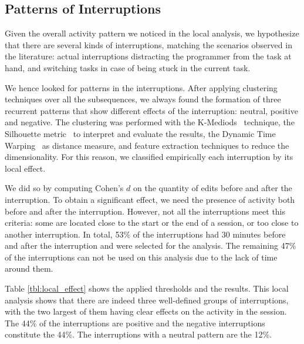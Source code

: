 \subsection{Patterns of Interruptions}
Given the overall activity pattern we noticed in the local analysis, we hypothesize that there are several kinds of interruptions, matching the scenarios observed in the literature: actual interruptions distracting the programmer from the task at hand, and switching tasks in case of being stuck in the current task.

We hence looked for patterns in the interruptions. After applying clustering techniques over all the subsequences, we always found the formation of three recurrent patterns that show different effects of the interruption: neutral, positive and negative. The clustering was performed with the  K-Mediods~\cite{AMP97} technique, the Silhouette metric~\cite{RP87} to interpret and evaluate the results, the Dynamic Time Warping~\cite{KE05} as distance measure, and feature extraction techniques to reduce the dimensionality.  For this reason, we classified empirically each interruption by its local effect. 

We did so by computing Cohen's $d$ on the quantity of edits before and after the interruption. To obtain a significant effect, we need the presence of activity both before and after the interruption. However, not all the interruptions meet this criteria: some are located close to the start or the end of a session, or too close to another interruption.  In total, 53\% of the interruptions had 30 minutes before and after the interruption and were selected for the analysis.  The remaining 47\% of the interruptions can not be used on this analysis due to the lack of time around them.


Table \ref{tbl:local_effect} shows the applied thresholds and the results. This local analysis shows that there are indeed three well-defined groups of interruptions, with the two largest of them having clear effects on the activity in the session. The 44\% of the interruptions are positive and the negative interruptions constitute the 44\%. The interruptions with a neutral pattern are the 12\%.


